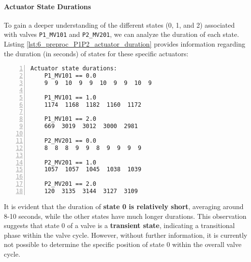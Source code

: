 		
		

\paragraph{Actuator State Durations}
\label{par:6_P1P2_actuators_duration}
To gain a deeper understanding of the different states (0, 1, and 2) associated with valves \texttt{P1\_MV101} and \texttt{P2\_MV201}, we can analyze the duration of each state. Listing \ref{lst:6_preproc_P1P2_actuator_duration} provides information regarding the duration (in seconds) of states for these specific actuators:

\begin{lstlisting}[language=bash, numbers=left, caption=Time duration of the states of actuators \texttt{P1\_MV101} and \texttt{P1\_MV201} of PLC1-2, label=lst:6_preproc_P1P2_actuator_duration]
	Actuator state durations:
	P1_MV101 == 0.0
	9  9  10  9  9  10  9  9  10  9
	
	P1_MV101 == 1.0
	1174  1168  1182  1160  1172
	
	P1_MV101 == 2.0
	669  3019  3012  3000  2981
	
	P2_MV201 == 0.0
	8  8  8  9  9  8  9  9  9  9
	
	P2_MV201 == 1.0
	1057  1057  1045  1038  1039
	
	P2_MV201 == 2.0
	120  3135  3144  3127  3109
\end{lstlisting}

\noindent It is evident that the duration of \textbf{state 0 is relatively short}, averaging around 8-10 seconds, while the other states have much longer durations. This observation suggests that state 0 of a valve is a \textbf{transient state}, indicating a transitional phase within the valve cycle. However, without further information, it is currently not possible to determine the specific position of state 0 within the overall valve cycle.


